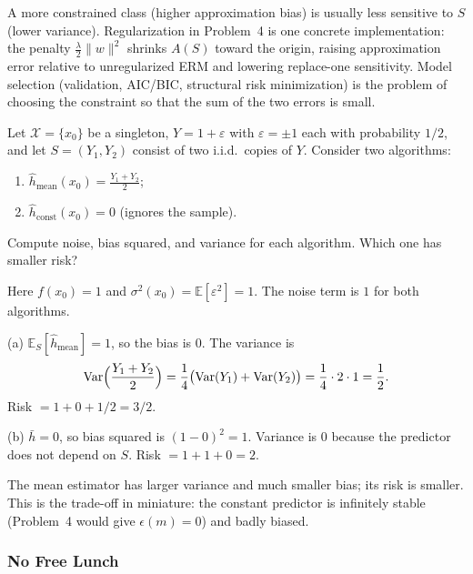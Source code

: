 \begin{property}
\label{prop:mlu-bv-tradeoff}
A more constrained class (higher approximation bias) is usually less sensitive to $S$ (lower variance). Regularization in Problem~4 is one concrete implementation: the penalty $\tfrac{\lambda}{2}\lVert w\rVert^2$ shrinks $A(S)$ toward the origin, raising approximation error relative to unregularized ERM and lowering replace-one sensitivity. Model selection (validation, AIC/BIC, structural risk minimization) is the problem of choosing the constraint so that the sum of the two errors is small.
\end{property}

\begin{exercise}
\label{ex:mlu-bv-num}
Let $\mathcal{X}=\{x_0\}$ be a singleton, $Y=1+\varepsilon$ with $\varepsilon=\pm 1$ each with probability $1/2$, and let $S=(Y_1,Y_2)$ consist of two i.i.d.\ copies of $Y$. Consider two algorithms:
\begin{enumerate}[label=(\alph*)]
    \item $\widehat{h}_{\mathrm{mean}}(x_0)=\frac{Y_1+Y_2}{2}$;
    \item $\widehat{h}_{\mathrm{const}}(x_0)=0$ (ignores the sample).
\end{enumerate}
Compute noise, bias squared, and variance for each algorithm. Which one has smaller risk?
\end{exercise}

\begin{solution}
Here $f(x_0)=1$ and $\sigma^2(x_0)=\mathbb{E}[\varepsilon^2]=1$. The noise term is $1$ for both algorithms.

(a) $\mathbb{E}_S[\widehat{h}_{\mathrm{mean}}]=1$, so the bias is $0$. The variance is
\[
\mathrm{Var}\Bigl(\frac{Y_1+Y_2}{2}\Bigr)
=
\frac14\bigl(\mathrm{Var}(Y_1)+\mathrm{Var}(Y_2)\bigr)
=
\frac14\cdot 2\cdot 1
=
\frac12.
\]
Risk $=1+0+1/2=3/2$.

(b) $\bar h=0$, so bias squared is $(1-0)^2=1$. Variance is $0$ because the predictor does not depend on $S$. Risk $=1+1+0=2$.

The mean estimator has larger variance and much smaller bias; its risk is smaller. This is the trade-off in miniature: the constant predictor is infinitely stable (Problem~4 would give $\epsilon(m)=0$) and badly biased.
\end{solution}


\subsubsection{No Free Lunch}
\label{subsubsec:mlu-nfl}

